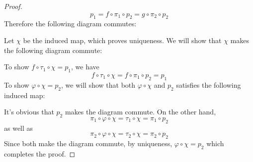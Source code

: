 \documentclass{article}
\begin{document}
\begin{proof}
\[    p_1=f\circ \pi_1\circ p_2=g\circ \pi_2\circ p_2
    \]
    Therefore the following diagram commutes:
    \begin{center}
    \end{center}
    Let $\chi$ be the induced map, which proves uniqueness. We will show that $\chi$ makes the following diagram commute:
    \begin{center}
    \end{center}
    To show $f\circ \tau_1\circ \chi=p_1$, we have
    \[
    f\circ \tau_1\circ \chi=f\circ \pi_1\circ p_2=p_1
    \]
    To show $\varphi \circ \chi=p_2$, we will show that both $\varphi\circ \chi$ and $p_2$ satisfies the following induced map:
    \begin{center}
    \end{center}
    It's obvious that $p_2$ makes the diagram commute. On the other hand,
    \[
    \pi_1\circ \varphi \circ \chi=\tau_1\circ \chi=\pi_1\circ p_2
    \]
    as well as
    \[
    \pi_2\circ \varphi\circ \chi=\tau_2\circ \chi=\pi_2\circ p_2
    \]
    Since both make the diagram commute, by uniqueness, $\varphi\circ \chi=p_2$ which completes the proof.
\end{proof}
\end{document}
